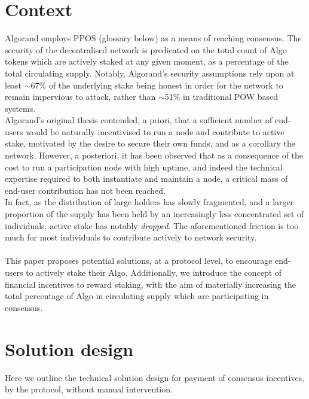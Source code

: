 \documentclass[11pt,a4paper]{article}
\begin{document}
\pagebreak

\section{Context}
Algorand employs \gls{PPOS} (glossary below) as a means of reaching consensus. The security of the decentralised network 
is predicated on the total count of Algo tokens which are actively staked at any given moment, as a percentage of the 
total circulating supply. Notably, Algorand's security assumptions rely upon at least $\sim$67\% of the underlying stake 
being honest in order for the network to remain impervious to attack, rather than $\sim$51\% in traditional \gls{POW} 
based systems. \\ 

Algorand's original thesis contended, a priori, that a sufficient number of end-users would be naturally incentivised to 
run a node and contribute to active stake, motivated by the desire to secure their own funds, and as a corollary the 
network. However, a posteriori, it has been observed that as a consequence of the cost to run a participation node with 
high uptime, and indeed the technical expertise required to both instantiate and maintain a node, a critical mass of 
end-user contribution has not been reached. \\

In fact, as the distribution of large holders has slowly fragmented, and a larger proportion of the supply has been held 
by an increasingly less concentrated set of individuals, active stake has notably \emph{dropped}. The aforementioned 
friction is too much for most individuals to contribute actively to network security. \\ \\

This paper proposes potential solutions, at a protocol level, to encourage end-users to actively stake their Algo.
Additionally, we introduce the concept of financial incentives to reward staking, with the aim of materially increasing 
the total percentage of Algo in circulating supply which are participating in consensus. 

\pagebreak

\section{Solution design}
Here we outline the technical solution design for payment of consensus incentives, by the protocol, without manual 
intervention. 
\end{document}
